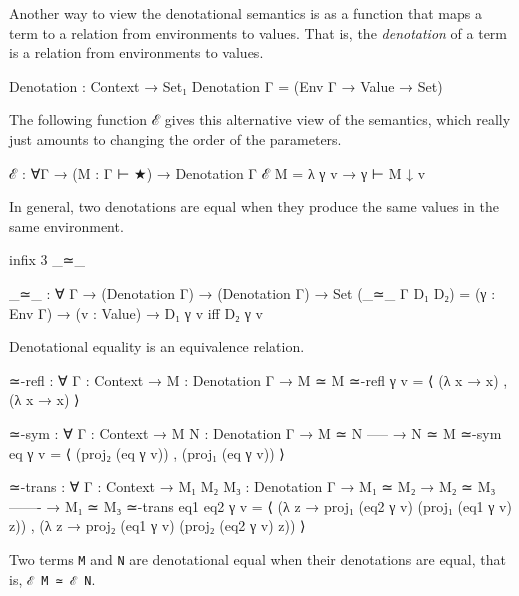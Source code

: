 Another way to view the denotational semantics is as a function that
maps a term to a relation from environments to values. That is, the
\emph{denotation} of a term is a relation from environments to values.

\begin{fence}
\begin{code}
Denotation : Context → Set₁
Denotation Γ = (Env Γ → Value → Set)
\end{code}
\end{fence}

The following function ℰ gives this alternative view of the semantics,
which really just amounts to changing the order of the parameters.

\begin{fence}
\begin{code}
ℰ : ∀{Γ} → (M : Γ ⊢ ★) → Denotation Γ
ℰ M = λ γ v → γ ⊢ M ↓ v
\end{code}
\end{fence}

In general, two denotations are equal when they produce the same values
in the same environment.

\begin{fence}
\begin{code}
infix 3 _≃_

_≃_ : ∀ {Γ} → (Denotation Γ) → (Denotation Γ) → Set
(_≃_ {Γ} D₁ D₂) = (γ : Env Γ) → (v : Value) → D₁ γ v iff D₂ γ v
\end{code}
\end{fence}

Denotational equality is an equivalence relation.

\begin{fence}
\begin{code}
≃-refl : ∀ {Γ : Context} → {M : Denotation Γ}
  → M ≃ M
≃-refl γ v = ⟨ (λ x → x) , (λ x → x) ⟩

≃-sym : ∀ {Γ : Context} → {M N : Denotation Γ}
  → M ≃ N
    -----
  → N ≃ M
≃-sym eq γ v = ⟨ (proj₂ (eq γ v)) , (proj₁ (eq γ v)) ⟩

≃-trans : ∀ {Γ : Context} → {M₁ M₂ M₃ : Denotation Γ}
  → M₁ ≃ M₂
  → M₂ ≃ M₃
    -------
  → M₁ ≃ M₃
≃-trans eq1 eq2 γ v = ⟨ (λ z → proj₁ (eq2 γ v) (proj₁ (eq1 γ v) z)) ,
                        (λ z → proj₂ (eq1 γ v) (proj₂ (eq2 γ v) z)) ⟩
\end{code}
\end{fence}

Two terms \texttt{M} and \texttt{N} are denotational equal when their
denotations are equal, that is, \texttt{ℰ\ M\ ≃\ ℰ\ N}.

